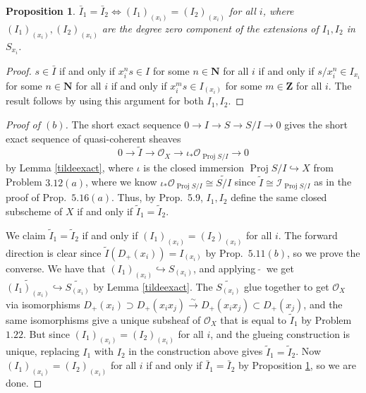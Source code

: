 \documentclass[12pt,letterpaper]{article}
\newtheorem{proposition}{Proposition}
\theoremstyle{definition}
\theoremstyle{remark}
\numberwithin{equation}{section}
\numberwithin{figure}{problem}
\DeclareMathOperator{\Proj}{Proj}
\newcommand{\II}{\mathscr{I}}
\newcommand{\OO}{\mathcal{O}}
\newcommand{\isoto}{\overset{\sim}{\to}}
\begin{document}
\begin{proposition}\label{projaffideal}
  $\bar{I}_1 = \bar{I}_2 \iff (I_1)_{(x_i)} = (I_2)_{(x_i)}$ for all $i$, where $(I_1)_{(x_i)},(I_2)_{(x_i)}$ are the degree zero component of the extensions of $I_1,I_2$ in $S_{x_i}$.
\end{proposition}
\begin{proof}
  $s \in \bar{I}$ if and only if $x_i^ns \in I$ for some $n \in \mathbf{N}$ for all $i$ if and only if $s/x_i^{n} \in I_{x_i}$ for some $n \in \mathbf{N}$ for all $i$ if and only if $x_i^ms \in I_{(x_i)}$ for some $m \in \mathbf{Z}$ for all $i$. The result follows by using this argument for both $I_1,I_2$.
\end{proof}
\begin{proof}[Proof of $(b)$]
  The short exact sequence $0 \to I \to S \to S/I \to 0$ gives the short exact sequence of quasi-coherent sheaves
  \begin{equation*}
    0 \longrightarrow \tilde{I} \longrightarrow \OO_X \longrightarrow \iota_*\OO_{\Proj S/I} \longrightarrow 0
  \end{equation*}
  by Lemma \ref{tildeexact}, where $\iota$ is the closed immersion $\Proj S/I \hookrightarrow X$ from Problem $3.12(a)$, where we know $\iota_*\OO_{\Proj S/I} \cong \widetilde{S/I}$ since $\tilde{I} \cong \II_{\Proj S/I}$ as in the proof of Prop.~$5.16(a)$. Thus, by Prop.~5.9, $I_1,I_2$ define the same closed subscheme of $X$ if and only if $\tilde{I}_1 = \tilde{I}_2$.
  \par We claim $\tilde{I}_1 = \tilde{I}_2$ if and only if $(I_1)_{(x_i)} = (I_2)_{(x_i)}$ for all $i$. The forward direction is clear since $\tilde{I}(D_+(x_i)) = I_{(x_i)}$ by Prop.~$5.11(b)$, so we prove the converse. We have that $(I_1)_{(x_i)} \hookrightarrow S_{(x_i)}$, and applying $\:\tilde{}\:$ we get $\widetilde{(I_1)_{(x_i)}} \hookrightarrow \widetilde{S_{(x_i)}}$ by Lemma \ref{tildeexact}. The $\widetilde{S_{(x_i)}}$ glue together to get $\OO_X$ via isomorphisms $D_+(x_i) \supset D_+(x_ix_j) \isoto D_+(x_ix_j) \subset D_+(x_j)$, and the same isomorphisms give a unique subsheaf of $\OO_X$ that is equal to $\tilde{I}_1$ by Problem $1.22$. But since $(I_1)_{(x_i)} = (I_2)_{(x_i)}$ for all $i$, and the glueing construction is unique, replacing $I_1$ with $I_2$ in the construction above gives $\tilde{I}_1 = \tilde{I}_2$. Now $(I_1)_{(x_i)} = (I_2)_{(x_i)}$ for all $i$ if and only if $\bar{I}_1 = \bar{I}_2$ by Proposition \ref{projaffideal}, so we are done.
\end{proof}
\end{document}
